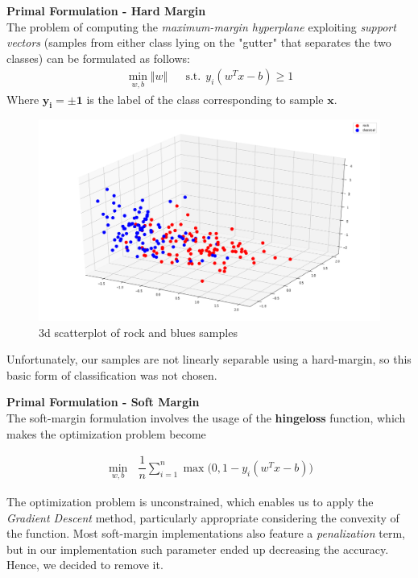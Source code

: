 \documentclass[12pt]{article}
\begin{document}
	\textbf{Primal Formulation - Hard Margin}\\
	The problem of computing the \textit{maximum-margin hyperplane} exploiting \textit{support vectors} (samples from either class lying on the "gutter" that separates the two classes) can be formulated as follows:\\
	\begin{align}
		\min_{w,b} \Vert w \Vert &&
		\text{s.t.}\ \ y_i(w^Tx-b)\ge 1
	\end{align} 
	Where $\mathbf{y_i =\pm 1}$ is the label of the class corresponding to sample $\mathbf{x}$.\\
	
	\begin{figure}[H]
		\hspace{120pt}\includegraphics[scale=0.2]{exp1_legend}
		\caption{3d scatterplot of rock and blues samples}
	\end{figure}
	
	Unfortunately, our samples are not linearly separable using a hard-margin, so this basic form of classification was not chosen.\newpage
	
	\textbf{Primal Formulation - Soft Margin}\\
	The soft-margin formulation involves the usage of the \textbf{hingeloss} function, which makes the optimization problem become
	
	\begin{align}
		\min_{w,b}\ \ \ \dfrac {1}{n} \sum_{i=1}^n{\max{\Big(0,1-y_i(w^Tx-b)\Big)}}
	\end{align}

	The optimization problem is unconstrained, which enables us to apply the \textit{Gradient Descent} method, particularly appropriate considering the convexity of the function. Most soft-margin implementations also feature a \textit{penalization} term, but in our implementation such parameter ended up decreasing the accuracy. Hence, we decided to remove it.
	
\end{document}
